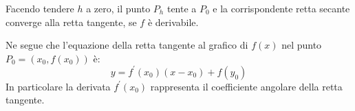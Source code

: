 Facendo tendere $h$ a zero, il punto $P_h$ tente a $P_0$ e la corrispondente retta secante converge alla retta tangente, se $f$ è derivabile.

Ne segue che l'equazione della retta tangente al grafico di $f(x)$ nel punto $P_0=(x_0,f(x_0))$ è:
\[y=f^\prime(x_0)(x-x_0)+f(y_0)\]
In particolare la derivata $f^\prime(x_0)$ rappresenta il coefficiente angolare della retta tangente. 